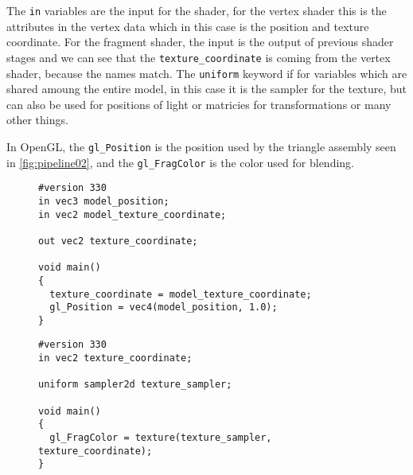 The \texttt{in} variables are the input for the shader, for the vertex shader this is the attributes in the vertex data which in this case is the position and texture coordinate. 
For the fragment shader, the input is the output of previous shader stages and we can see that the \texttt{texture\_coordinate} is coming from the vertex shader, because the names match.
The \texttt{uniform} keyword if for variables which are shared amoung the entire model, in this case it is the sampler for the texture, but can also be used for positions of light or matricies for transformations or many other things.

In OpenGL, the \texttt{gl\_Position} is the position used by the triangle assembly seen in \cref{fig:pipeline02}, and the \texttt{gl\_FragColor} is the color used for blending.

\begin{figure}[H]
\begin{lstlisting}[caption={This vertex shader takes in a position and a texture coordinate. It parses the position into the standard \texttt{gl\_Position} vector which is used internally by OpenGL. The texture coordinate is parsed through to the output and will be liniar interpolated between output from other verticies. (GLSL)},label={lst:pipeline_vertex_shader}]
#version 330
in vec3 model_position;
in vec2 model_texture_coordinate;

out vec2 texture_coordinate;

void main()
{
  texture_coordinate = model_texture_coordinate;
  gl_Position = vec4(model_position, 1.0);
}
\end{lstlisting}
\end{figure}

\begin{figure}[H]
\begin{lstlisting}[caption={This fragment shader takes a linear interpolated texture coordinate and finds the corrosponding color in a texture using a texture sampler. The sampler determine what strategy to use for super- and sub-sampling, popular strategies include linear interpolating, bilinear interpolating and nearest-neighbor. The output is then set to a standard \texttt{gl\_FragColor} vector which is used by OpenGL internally. (GLSL)}, label={lst:pipeline_fragment_shader}]
#version 330
in vec2 texture_coordinate;

uniform sampler2d texture_sampler;

void main()
{
  gl_FragColor = texture(texture_sampler, texture_coordinate);
}
\end{lstlisting}
\end{figure}

